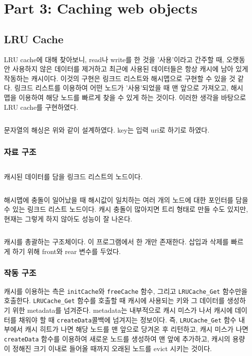 \documentclass{report}
\begin{document}
\section{Part 3: Caching web objects}
\subsection{LRU Cache}
LRU cache에 대해 찾아보니, read나 write를 한 것을 '사용'이라고 간주할 때, 오랫동안 사용하지 않은 데이터를 제거하고 최근에 사용된 데이터들은 항상 캐시에 남아 있게 작동하는 캐시이다. 이것의 구현은 링크드 리스트와 해시맵으로 구현할 수 있을 것 같다. 링크드 리스트를 이용하여 어떤 노드가 '사용'되었을 때 맨 앞으로 가져오고, 해시맵을 이용하여 해당 노드를 빠르게 찾을 수 있게 하는 것이다.
이러한 생각을 바탕으로 LRU cache를 구현하였다.

\inputminted[firstline=150,lastline=158, linenos, breaklines]{C}{../submit/lrucache.c}
문자열의 해싱은 위와 같이 설계하였다. key는 입력 uri로 하기로 하였다.

\subsubsection{자료 구조}
\inputminted[firstline=5,lastline=11, linenos, breaklines]{C}{../submit/lrucache.h}
캐시된 데이터를 담을 링크드 리스트의 노드이다.

\inputminted[firstline=13,lastline=18, linenos, breaklines]{C}{../submit/lrucache.h}
해시맵에 충돌이 일어났을 때 해시값이 일치하는 여러 개의 노드에 대한 포인터를 담을 수 있는 링크드 리스트 노드이다. 캐시 충돌이 많아지면 트리 형태로 만들 수도 있지만, 현재는 그렇게 하지 않아도 성능이 잘 나온다.

\inputminted[firstline=20,lastline=25, linenos, breaklines]{C}{../submit/lrucache.h}
캐시를 총괄하는 구조체이다. 이 프로그램에서 한 개만 존재한다. 삽입과 삭제를 빠르게 하기 위해 front와 rear 변수를 두었다.

\subsubsection{작동 구조}
캐시를 이용하는 측은 \lstinline{initCache}와 \lstinline{freeCache} 함수, 그리고 \lstinline{LRUCache_Get} 함수만을 호출한다. \lstinline{LRUCache_Get} 함수를 호출할 때 캐시에 사용되는 키와 그 데이터를 생성하기 위한 metadata를 넘겨준다. metadata는 내부적으로 캐시 미스가 나서 캐시에 데이터를 채워야 할 때 \lstinline{createData}콜백에 넘겨지는 정보이다. 즉, \lstinline{LRUCache_Get} 함수 내부에서 캐시 히트가 나면 해당 노드를 맨 앞으로 당겨온 후 리턴하고, 캐시 미스가 나면 \lstinline{createData} 함수를 이용하여 새로운 노드를 생성하여 맨 앞에 추가하고, 캐시의 용량이 정해진 크기 이내로 들어올 때까지 오래된 노드를 evict 시키는 것이다.
\end{document}
